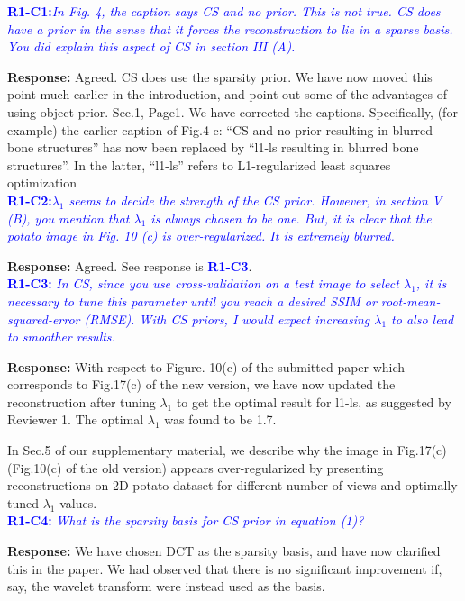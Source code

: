 \documentclass{article}
\begin{document}
\textcolor{blue}{\textbf{R1-C1:}\textit{In Fig. 4, the caption says CS and no prior. This is not true. CS does have a prior in the sense that it forces the reconstruction to lie in a sparse basis. You did explain this aspect of CS in section III (A).}}

\textbf{Response:} Agreed.  CS does use the sparsity prior. We have now moved this point much earlier in the introduction, and point out some of the advantages of using object-prior. Sec.1, Page1. We have corrected the captions. Specifically, (for example) the earlier caption of Fig.4-c: ``CS and no prior resulting in blurred bone structures'' has now been replaced by ``l1-ls resulting in blurred bone structures''. In the latter, ``l1-ls'' refers to L1-regularized least squares optimization \\

\textcolor{blue}{\textbf{R1-C2:}\textit{$\lambda_1$ seems to decide the strength of the CS prior. However, in section V (B), you mention that $\lambda_1$ is always chosen to be one. But, it is clear that the potato image in Fig. 10 (c) is over-regularized. It is extremely blurred.}}

\textbf{Response:} Agreed. See response is \textcolor{blue}{\textbf{R1-C3}}.\\

\textcolor{blue}{\textbf{R1-C3:}\textit{ In CS, since you use cross-validation on a test image to select $\lambda_1$, it is necessary to tune this parameter until you reach a desired SSIM or root-mean-squared-error (RMSE). With CS priors, I would expect increasing $\lambda_1$ to also lead to smoother results.}}  

\textbf{Response:} With respect to Figure. 10(c) of the submitted paper which corresponds to Fig.17(c) of the new version, we have now updated the reconstruction after tuning $\lambda_1$ to get the optimal result for l1-ls, as suggested by Reviewer 1. The optimal $\lambda_1$ was found to be 1.7. 

In Sec.5 of our supplementary material, we describe why the image in Fig.17(c) (Fig.10(c) of the old version) appears over-regularized by presenting reconstructions on 2D potato dataset for different number of views and optimally tuned $\lambda_1$ values.   \\

\textcolor{blue}{\textbf{R1-C4:}\textit{ What is the sparsity basis for CS prior in equation (1)? }}

\textbf{Response:} We have chosen DCT as the sparsity basis, and have now clarified this in the paper. We had observed that there is no significant improvement if, say, the wavelet transform were instead used as the basis.\\
\end{document}
